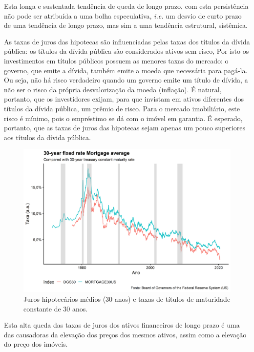 \documentclass[
	12pt,				%
	oneside,			%
	a4paper,			%
	chapter=TITLE,		%
	section=TITLE,		%
	english,			%
	brazil				%
	]{abntex2}
\begin{document}
Esta longa e sustentada tendência de queda de longo prazo, com esta
persistência não pode ser atribuída a uma bolha especulativa,
\emph{i.e.} um desvio de curto prazo de uma tendência de longo prazo,
mas sim a uma tendência estrutural, sistêmica.

As taxas de juros das hipotecas são influenciadas pelas taxas dos
títulos da dívida pública: os títulos da dívida pública são considerados
ativos sem risco, Por isto os investimentos em títulos públicos possuem
as menores taxas do mercado: o governo, que emite a dívida, também emite
a moeda que necessária para pagá-la. Ou seja, não há risco verdadeiro
quando um governo emite um título de dívida, a não ser o risco da
própria desvalorização da moeda (inflação). É natural, portanto, que os
investidores exijam, para que invistam em ativos diferentes dos títulos
da dívida pública, um prêmio de risco. Para o mercado imobiliário, este
risco é mínimo, pois o empréstimo se dá com o imóvel em garantia. É
esperado, portanto, que as taxas de juros das hipotecas sejam apenas um
pouco superiores aos títulos da dívida pública.
\begin{figure}[H]

{\centering \includegraphics[width=\textwidth]{images/mortagages-1} 

}

\caption{Juros hipotecários médios (30 anos) e taxas de títulos de maturidade constante de 30 anos.}\label{fig:mortagages}
\end{figure}
Esta alta queda das taxas de juros dos ativos financeiros de longo prazo
é uma das causadoras da elevação dos preços dos mesmos ativos, assim
como a elevação do preço dos imóveis.
\end{document}
